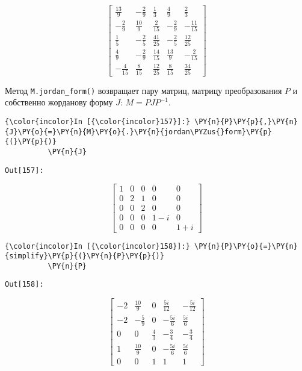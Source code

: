     \[\left[\begin{matrix}\frac{13}{9} & - \frac{2}{9} & \frac{1}{3} & \frac{4}{9} & \frac{2}{3}\\- \frac{2}{9} & \frac{10}{9} & \frac{2}{15} & - \frac{2}{9} & - \frac{11}{15}\\\frac{1}{5} & - \frac{2}{5} & \frac{41}{25} & - \frac{2}{5} & \frac{12}{25}\\\frac{4}{9} & - \frac{2}{9} & \frac{14}{15} & \frac{13}{9} & - \frac{2}{15}\\- \frac{4}{15} & \frac{8}{15} & \frac{12}{25} & \frac{8}{15} & \frac{34}{25}\end{matrix}\right]\]

    

    Метод \texttt{M.jordan\_form()} возвращает пару матриц, матрицу
преобразования \(P\) и собственно жорданову форму \(J\):
\(M = P J P^{-1}\).

    \begin{Verbatim}[commandchars=\\\{\}]
{\color{incolor}In [{\color{incolor}157}]:} \PY{n}{P}\PY{p}{,}\PY{n}{J}\PY{o}{=}\PY{n}{M}\PY{o}{.}\PY{n}{jordan\PYZus{}form}\PY{p}{(}\PY{p}{)}
          \PY{n}{J}
\end{Verbatim}
\texttt{\color{outcolor}Out[{\color{outcolor}157}]:}
    
    \[\left[\begin{matrix}1 & 0 & 0 & 0 & 0\\0 & 2 & 1 & 0 & 0\\0 & 0 & 2 & 0 & 0\\0 & 0 & 0 & 1 - i & 0\\0 & 0 & 0 & 0 & 1 + i\end{matrix}\right]\]

    

    \begin{Verbatim}[commandchars=\\\{\}]
{\color{incolor}In [{\color{incolor}158}]:} \PY{n}{P}\PY{o}{=}\PY{n}{simplify}\PY{p}{(}\PY{n}{P}\PY{p}{)}
          \PY{n}{P}
\end{Verbatim}
\texttt{\color{outcolor}Out[{\color{outcolor}158}]:}
    
    \[\left[\begin{matrix}-2 & \frac{10}{9} & 0 & \frac{5 i}{12} & - \frac{5 i}{12}\\-2 & - \frac{5}{9} & 0 & - \frac{5 i}{6} & \frac{5 i}{6}\\0 & 0 & \frac{4}{3} & - \frac{3}{4} & - \frac{3}{4}\\1 & \frac{10}{9} & 0 & - \frac{5 i}{6} & \frac{5 i}{6}\\0 & 0 & 1 & 1 & 1\end{matrix}\right]\]


